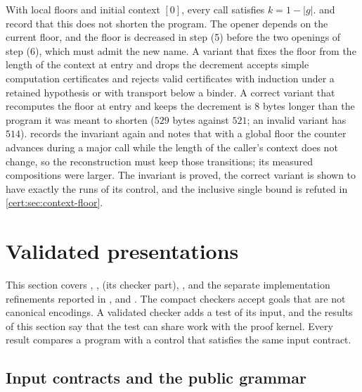 \begin{remark}\label{cert:rem:floor-shortcut}
With local floors and initial context $[0]$, every call satisfies
$k=1-\lvert g\rvert$.  and
 record that this does not shorten the program.
The opener depends on the current floor, and the floor is decreased in step
(5) before the two openings of step (6), which must admit the new name. A
variant that fixes the floor from the length of the context at entry and
drops the decrement accepts simple computation certificates and rejects valid
certificates with induction under a retained hypothesis or with transport
below a binder. A correct variant that recomputes the floor at entry and
keeps the decrement is $8$ bytes longer than the program it was meant to
shorten ($529$ bytes against $521$; an invalid variant has $514$).
 records the invariant again and notes that with
a global floor the counter advances during a major call while the length of
the caller's context does not change, so the reconstruction must keep those
transitions; its measured compositions were larger. The invariant is proved,
the correct variant is shown to have exactly the runs of its control, and the
inclusive single bound is refuted in \cref{cert:sec:context-floor}.
\end{remark}

\section{Validated presentations}\label{cert:sec:validated}

This section covers , ,
 (its checker part), , and the
separate implementation refinements reported in
,  and
. The compact checkers accept goals that are not
canonical encodings. A validated checker adds a test of its input, and the
results of this section say that the test can share work with the proof
kernel. Every result compares a program with a control that satisfies the
same input contract.

\subsection{Input contracts and the public grammar}

